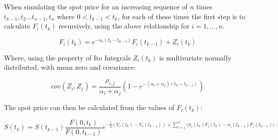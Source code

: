 \documentclass{article}
\begin{document}
\bigskip

When simulating the spot price for an increasing sequence of $n$
times $t_{k-1}, t_2 \hdots t_{n-1}, t_n$ where $0 < t_{k-1} < t_k$, for each of these
times the first step is to calculate $F_i(t_k)$ recursively, using the above relationship %
for $i = 1, \hdots, n$.

\begin{equation}
    F_i(t_k) = e^{-\alpha_i(t_k - t_{k-1})}F_i(t_{k-1}) + Z_i(t_k)
\end{equation}

Where, using the property of Ito Integrals $Z_i(t_k)$ is multivariate normally 
distributed, with mean zero and covariance:

\begin{equation}
    cov(Z_i, Z_j) = \frac{\rho_{i, j}}{\alpha_i + \alpha_j}(1 - 
    e^{-(\alpha_i + \alpha_j)(t_k - t_{k-1})})
\end{equation}

The spot price can then be calculated from the values of $F_i(t_k)$:

\begin{equation}
    S(t_k) = S(t_{k-1}) \frac{F(0, t_k)}{F(0, t_{k-1})} e^{- \frac{1}{2} (V_s(t_k) - 
    V_s(t_{k-1})) + \sum_{i=1}^n \bigl(\sigma_i(t_k)F_i(t_k) - \sigma_i(t_{k-1})F_i(t_{k-1})\bigr)}
\end{equation}





\end{document}
